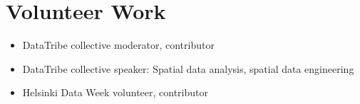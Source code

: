 \documentclass[a4paper,11pt]{article}
\newcommand{\resumeItem}[1]{
	\item\small{#1}
}
\newcommand{\resumeItemListStart}{\begin{itemize}[rightmargin=0.11in]}
\newcommand{\resumeItemListEnd}{\end{itemize}}
\begin{document}

	\section{Volunteer Work}
	\resumeItemListStart{}
	\resumeItem{DataTribe collective moderator, contributor}
	\resumeItem{DataTribe collective speaker: Spatial data analysis, spatial data engineering}
	\resumeItem{Helsinki Data Week volunteer, contributor}

	\resumeItemListEnd{}
	
\end{document}
